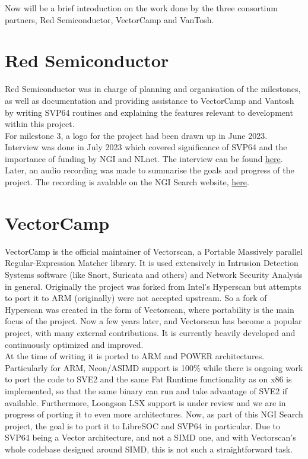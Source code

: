 Now will be a brief introduction on the work done by the three consortium
partners, Red Semiconductor, VectorCamp and VanTosh.

\section{Red Semiconductor}

Red Semiconductor was in charge of planning and organisation of the milestones,
as well as documentation and providing assistance to VectorCamp and Vantosh
by writing SVP64 routines and explaining the features relevant to development
within this project.\\

For milestone 3, a logo for the project had been drawn up in June 2023.\\

Interview was done in July 2023 which covered significance of SVP64 and
the importance of funding by NGI and NLnet.
The interview can be found
\href{https://spaces.fundingbox.com/spaces/ngi-community-ngi-innovators/64b8dadbabf7a659885ee01e}{here}.\\

Later, an audio recording was made to summarise the goals and progress of the
project. The recording is avalable on the NGI Search website, 
\href{https://www.ngisearch.eu/view/Events/OC1Searchers}{here}.

\section{VectorCamp}

VectorCamp is the official maintainer of Vectorscan, a Portable Massively
parallel Regular-Expression Matcher library. It is used extensively in
Intrusion Detection Systems software (like Snort, Suricata and others)
and Network Security Analysis in general. Originally the project was forked
from Intel’s Hyperscan but attempts to port it to ARM (originally) were not
accepted upstream. So a fork of Hyperscan was created in the form of
Vectorscan, where portability is the main focus of the project.
Now a few years later, and Vectorscan has become a popular project,
with many external contributions. It is currently heavily developed and
continuously optimized and improved.\\

At the time of writing it is ported
to ARM and POWER architectures. Particularly for ARM, Neon/ASIMD support
is 100\% while there is ongoing work to port the code to SVE2 and
the same Fat Runtime functionality as on x86 is implemented,
so that the same binary can run and take advantage of SVE2 if available.
Furthermore, Loongson LSX support is under review and we are in progress of
porting it to even more architectures.
Now, as part of this NGI Search project, the goal is to port it to LibreSOC
and SVP64 in particular. Due to SVP64 being a Vector architecture,
and not a SIMD one, and with Vectorscan’s whole codebase designed around SIMD,
this is not such a straightforward task.\\

